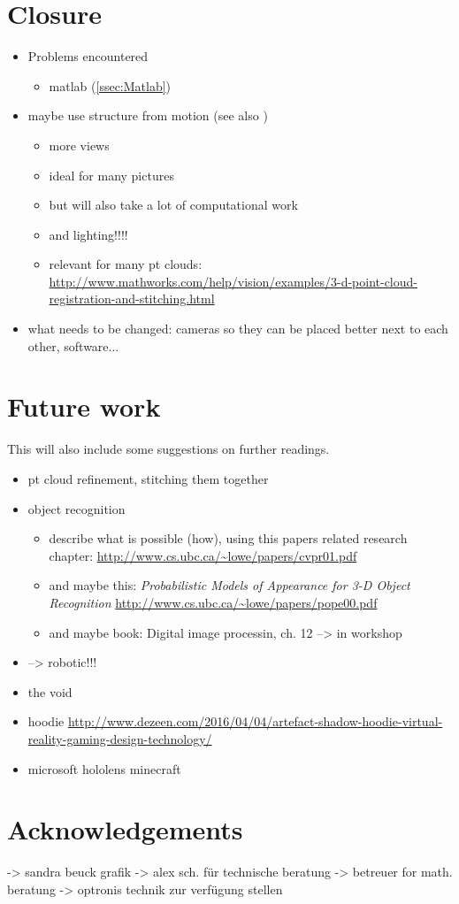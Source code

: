 \section{Closure}
\begin{itemize}
\item Problems encountered
	\begin{itemize}
	\item matlab (\autoref{ssec:Matlab})
	\end{itemize}
\item maybe use structure from motion (see also \cite{Gordon.2004})
	\begin{itemize}
	\item more views
	\item ideal for many pictures
	\item but will also take a lot of computational work
	\item and lighting!!!!
	\item relevant for many pt clouds: \url{http://www.mathworks.com/help/vision/examples/3-d-point-cloud-registration-and-stitching.html}
	\end{itemize}
\item what needs to be changed: cameras so they can be placed better next to each other, software...

\end{itemize}


\section{Future work}\label{sec:Future}
This will also include some suggestions on further readings.

\begin{itemize}
\item pt cloud refinement, stitching them together
\item object recognition
	\begin{itemize}
	\item describe what is possible (how), using this papers related research chapter: \cite{Lowe.2001} \url{http://www.cs.ubc.ca/~lowe/papers/cvpr01.pdf}
	\item and maybe this: \textit{Probabilistic Models of Appearance for 3-D Object Recognition}  \url{http://www.cs.ubc.ca/~lowe/papers/pope00.pdf}
	\item and maybe book: Digital image processin, ch. 12 --> in workshop
	\end{itemize}
\item --> robotic!!!
\item the void
\item hoodie \url{http://www.dezeen.com/2016/04/04/artefact-shadow-hoodie-virtual-reality-gaming-design-technology/}
\item microsoft hololens minecraft
	
\end{itemize}

\section{Acknowledgements}\label{sec:Ack}
-> sandra beuck grafik
-> alex sch. für technische beratung
-> betreuer for math. beratung
-> optronis technik zur verfügung stellen  
